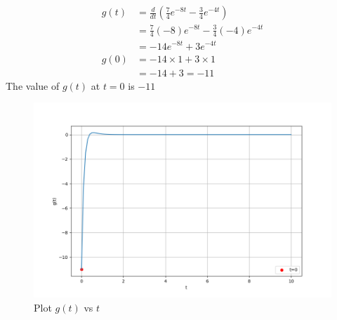 \documentclass[journal,12pt,twocolumn]{IEEEtran}
\newcommand{\brak}[1]{\left( #1 \right)}
\theoremstyle{remark}
\begin{document}
\begin{align}
g(t) &= \frac{d}{dt}\brak{\frac{7}{4}e^{-8t} - \frac{3}{4}e^{-4t}} \\
&= \frac{7}{4}(-8)e^{-8t} - \frac{3}{4}(-4)e^{-4t} \\
&= -14e^{-8t} + 3e^{-4t} \\
g(0) &= -14 \times 1 + 3 \times 1 \\
&= -14 + 3 = -11
\end{align}
The value of $g(t)$ at $t = 0$ is $-11$ \\
\begin{figure}[h!]
\centering
\includegraphics[width=\columnwidth]{figs/stem_plot.png}
\caption{Plot $g(t)$ vs $t$ }
\label{fig:tansh_plott}
\end{figure}
\end{document}
